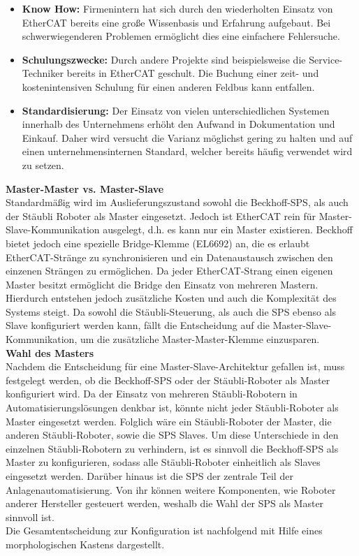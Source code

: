 \documentclass[ a4paper,
                oneside,
                toc=bibliography,
                toc=listof
                ]{scrbook}
\begin{document}
	\begin{itemize}
		\item \textbf{Know How: } Firmenintern hat sich durch den wiederholten Einsatz von EtherCAT bereits eine große Wissenbasis und Erfahrung aufgebaut. Bei schwerwiegenderen Problemen ermöglicht dies eine einfachere Fehlersuche.
		\item \textbf{Schulungszwecke: } Durch andere Projekte sind beispielsweise die Service-Techniker bereits in EtherCAT geschult. Die Buchung einer zeit- und kostenintensiven Schulung für einen anderen Feldbus kann entfallen.
		\item \textbf{Standardisierung:} Der Einsatz von vielen unterschiedlichen Systemen innerhalb des Unternehmens erhöht den Aufwand in Dokumentation und Einkauf. Daher wird versucht die Varianz möglichst gering zu halten und auf einen unternehmensinternen Standard, welcher bereits häufig verwendet wird zu setzen.\\
	\end{itemize}
	\textbf{Master-Master vs. Master-Slave}\\
	Standardmäßig wird im Auslieferungszustand sowohl die Beckhoff-SPS, als auch der Stäubli Roboter als Master eingesetzt. Jedoch ist EtherCAT rein für Master-Slave-Kommunikation ausgelegt, d.h. es kann nur ein Master existieren. \cite{ethercat}	Beckhoff bietet jedoch eine spezielle Bridge-Klemme (EL6692) an, die es erlaubt EtherCAT-Stränge zu synchronisieren und ein Datenaustausch zwischen den einzenen Strängen zu ermöglichen. Da jeder EtherCAT-Strang einen eigenen Master besitzt ermöglicht die Bridge den Einsatz von mehreren Mastern. \cite{Bridge} Hierdurch entstehen jedoch zusätzliche Kosten und auch die Komplexität des Systems steigt. Da sowohl die Stäubli-Steuerung, als auch die SPS ebenso als Slave konfiguriert werden kann, fällt die Entscheidung auf die Master-Slave-Kommunikation, um die zusätzliche Master-Master-Klemme einzusparen.\\
	\textbf{Wahl des Masters} \\
	Nachdem die Entscheidung für eine Master-Slave-Architektur gefallen ist, muss festgelegt werden, ob die Beckhoff-SPS oder der Stäubli-Roboter als Master konfiguriert wird. Da der Einsatz von mehreren Stäubli-Robotern in Automatisierungslösungen denkbar ist, könnte nicht jeder Stäubli-Roboter als Master eingesetzt werden. Folglich wäre ein Stäubli-Roboter der Master, die anderen Stäubli-Roboter, sowie die SPS Slaves. Um diese Unterschiede in den einzelnen Stäubli-Robotern zu verhindern, ist es sinnvoll die Beckhoff-SPS als Master zu konfigurieren, sodass alle Stäubli-Roboter einheitlich als Slaves eingesetzt werden. Darüber hinaus ist die SPS der zentrale Teil der Anlagenautomatisierung. Von ihr können weitere Komponenten, wie Roboter anderer Hersteller gesteuert werden, weshalb die Wahl der SPS als Master sinnvoll ist.\\
	Die Gesamtentscheidung zur Konfiguration ist nachfolgend mit Hilfe eines morphologischen Kastens dargestellt.\\
	
\end{document}
